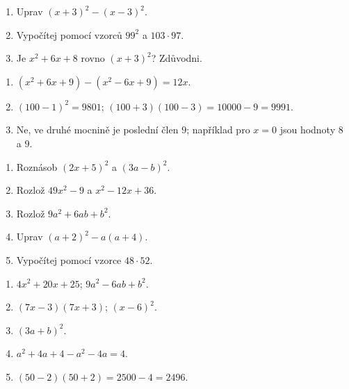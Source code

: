 \documentclass[11pt,a4paper]{article}
\begin{document}
\begin{zadaniReseniBox}[title={Rezerva: použij vzorec místo dlouhého násobení},breakable=false]
\begin{enumerate}[label=\alph*)]
\item Uprav $(x+3)^2-(x-3)^2$.
\item Vypočítej pomocí vzorců $99^2$ a $103\cdot97$.
\item Je $x^2+6x+8$ rovno $(x+3)^2$? Zdůvodni.
\end{enumerate}
\tcblower
\begin{enumerate}[label=\alph*)]
\item $(x^2+6x+9)-(x^2-6x+9)=12x$.
\item $(100-1)^2=9801$; $(100+3)(100-3)=10000-9=9991$.
\item Ne, ve druhé mocnině je poslední člen $9$; například pro $x=0$ jsou hodnoty $8$ a $9$.
\end{enumerate}
\end{zadaniReseniBox}




\begin{zadaniReseniBox}[title={Domácí úlohy},breakable=false]
\begin{enumerate}[label=\alph*)]
\item Roznásob $(2x+5)^2$ a $(3a-b)^2$.
\item Rozlož $49x^2-9$ a $x^2-12x+36$.
\item Rozlož $9a^2+6ab+b^2$.
\item Uprav $(a+2)^2-a(a+4)$.
\item Vypočítej pomocí vzorce $48\cdot52$.
\end{enumerate}
\tcblower
\begin{enumerate}[label=\alph*)]
\item $4x^2+20x+25$; $9a^2-6ab+b^2$.
\item $(7x-3)(7x+3)$; $(x-6)^2$.
\item $(3a+b)^2$.
\item $a^2+4a+4-a^2-4a=4$.
\item $(50-2)(50+2)=2500-4=2496$.
\end{enumerate}
\end{zadaniReseniBox}
\end{document}
